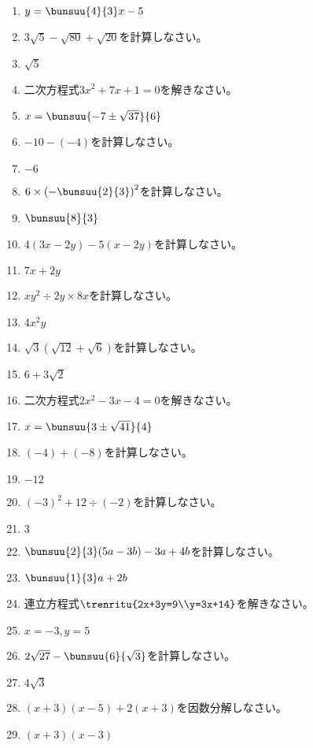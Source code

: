 \documentclass[uplatex,a4j,11pt]{jsreport}
\begin{document}
\begin{multicols}{2}
\begin{enumerate}
    \item $y=\bunsuu{4}{3}x-5$
    \item $3\sqrt{5}-\sqrt{80}+\sqrt{20}$\quad を計算しなさい。%
    \item $\sqrt{5}$
    \item 二次方程式\quad$3x^2+7x+1=0$\quad を解きなさい。%
    \item $x=\bunsuu{-7\pm\sqrt{37}}{6}$
    \item $-10-(-4)$\quad を計算しなさい。%
    \item $-6$
    \item $6\times \left(-\bunsuu{2}{3}\right)^2$\quad を計算しなさい。%
    \item $\bunsuu{8}{3}$
    \item $4(3x-2y)-5(x-2y)$\quad を計算しなさい。%
    \item $7x+2y$
    \item $xy^2\div 2y\times 8x$\quad を計算しなさい。%
    \item $4x^2y$
    \item $\sqrt{3}(\sqrt{12}+\sqrt{6})$\quad を計算しなさい。%
    \item $6+3\sqrt{2}$
    \item 二次方程式\quad$2x^2-3x-4=0$\quad を解きなさい。%
    \item $x=\bunsuu{3\pm\sqrt{41}}{4}$
    \item $(-4)+(-8)$\quad を計算しなさい。%
    \item $-12$
    \item $(-3)^2+12\div (-2)$\quad を計算しなさい。%
    \item $3$
    \item $\bunsuu{2}{3}(5a-3b)-3a+4b$\quad を計算しなさい。%
    \item $\bunsuu{1}{3}a+2b$
    \item 連立方程式\quad$\trenritu{2x+3y=9\\y=3x+14}$\quad を解きなさい。%
    \item $x=-3, y=5$
    \item $2\sqrt{27}-\bunsuu{6}{\sqrt{3}}$\quad を計算しなさい。%
    \item $4\sqrt{3}$
    \item $(x+3)(x-5)+2(x+3)$\quad を因数分解しなさい。%
    \item $(x+3)(x-3)$

\end{enumerate}
\end{multicols}
\end{document}
